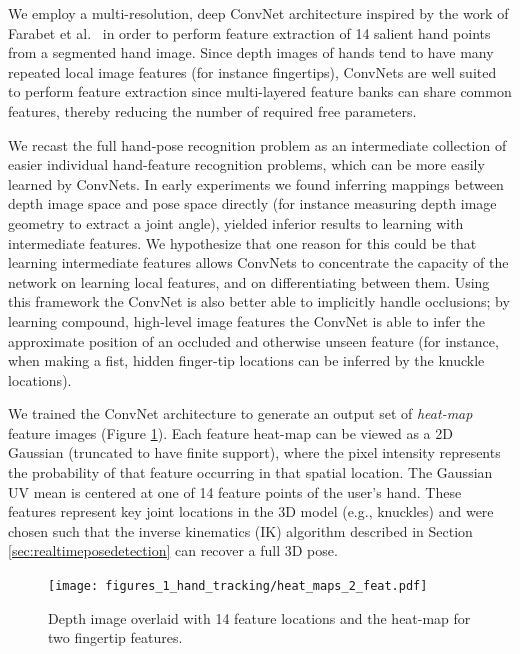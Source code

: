 We employ a multi-resolution, deep ConvNet architecture inspired by the work of Farabet et al.~\cite{Farabet} in order to perform feature extraction of 14 salient hand points from a segmented hand image. Since depth images of hands tend to have many repeated local image features (for instance fingertips), ConvNets are well suited to perform feature extraction since multi-layered feature banks can share common features, thereby reducing the number of required free parameters.

We recast the full hand-pose recognition problem as an intermediate collection of easier individual hand-feature recognition problems, which can be more easily learned by ConvNets. In early experiments we found inferring mappings between depth image space and pose space directly (for instance measuring depth image geometry to extract a joint angle), yielded inferior results to learning with intermediate features. We hypothesize that one reason for this could be that learning intermediate features allows ConvNets to concentrate the capacity of the network on learning local features, and on differentiating between them. Using this framework the ConvNet is also better able to implicitly handle occlusions; by learning compound, high-level image features the ConvNet is able to infer the approximate position of an occluded and otherwise unseen feature (for instance, when making a fist, hidden finger-tip locations can be inferred by the knuckle locations).

We trained the ConvNet architecture to generate an output set of \emph{heat-map} feature images (Figure \ref{fig:heat_maps}). Each feature heat-map can be viewed as a 2D Gaussian (truncated to have finite support), where the pixel intensity represents the probability of that feature occurring in that spatial location. The Gaussian UV mean is centered at one of 14 feature points of the user's hand. These features represent key joint locations in the 3D model (e.g., knuckles) and were chosen such that the inverse kinematics (IK) algorithm described in Section \ref{sec:realtimeposedetection} can recover a full 3D pose.

\begin{figure}[ht]
\centering
\texttt{[image: figures\_1\_hand\_tracking/heat\_maps\_2\_feat.pdf]}
    \caption{Depth image overlaid with 14 feature locations and the heat-map for two fingertip features.}
    \label{fig:heat_maps}
\end{figure}

